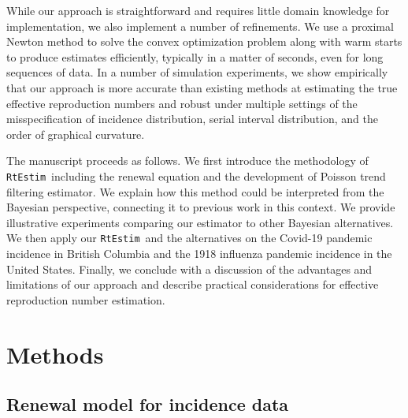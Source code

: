 \documentclass[10pt,letterpaper]{article}
\def\RtEstim{\texttt{RtEstim}}
\begin{document}
While our approach is straightforward and requires little domain knowledge for
implementation, we also implement a number of refinements. 
We use a proximal Newton method to solve the convex optimization problem along
with warm starts to produce estimates efficiently, typically in a matter of 
seconds, even for long sequences of data. In a number of simulation experiments, 
we show empirically that our approach is more accurate than existing methods at 
estimating the true effective reproduction numbers and robust under multiple 
settings of the misspecification of incidence distribution, serial interval 
distribution, and the order of graphical curvature. 


The manuscript proceeds as follows. We first introduce the methodology of
\RtEstim\ including the renewal equation and the development of Poisson
trend filtering estimator. We explain how this method could be interpreted from
the Bayesian perspective, connecting it to previous work in this context. We
provide illustrative experiments comparing our estimator to other Bayesian alternatives. 
We then apply our \RtEstim\ and the alternatives on the Covid-19 pandemic incidence in
British Columbia and the 1918 influenza pandemic incidence in the United States. 
Finally, we conclude with a discussion of the advantages and limitations of our 
approach and describe practical considerations for effective reproduction number
estimation.


\section{Methods}

\subsection{Renewal model for incidence data} 
\end{document}
